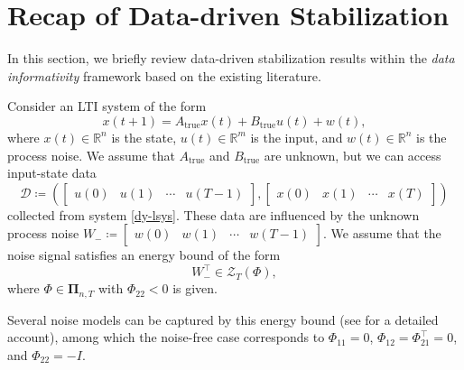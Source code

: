 \documentclass[9pt,shortpaper,twoside,web]{ieeecolor}
\newcommand{\beq}{\begin{equation}}
\newcommand{\eeq}{\end{equation}}
\newcommand{\R}{\mathbb{R}}
\begin{document}
\section{Recap of Data-driven Stabilization}
\label{sec:II}
In this section, we briefly review data-driven stabilization results within the \emph{data informativity} framework \cite{van2020data,HenkSlemma,van2023informativity,DBLSCT2025} based on the existing literature. %

Consider an LTI system of the form
\beq
  x(t+1)=A_\text{true}x(t)+B_\text{true}u(t)+w(t),
  \label{dy-lsys}
\eeq
where $x(t)\in\R^n$ is the state, $u(t) \in \R^m$ is the input, and $w(t)\in\R^n$ is the process noise. We assume that $A_\text{true}$ and $B_\text{true}$ are unknown, but we can access input-state data
\begin{equation}
\label{eq:data}
\mathcal{D}\!\coloneqq\!\left(\begin{bmatrix}
    u(0) \!\!&\!\! u(1)  \!\!&\!\! \cdots \!\!&\!\! u(T-1)
\end{bmatrix}, \begin{bmatrix}
    x(0) \!\!&\!\! x(1) \!\!&\!\! \cdots \!\!&\!\! x(T)
\end{bmatrix}\right)
\end{equation} 
collected from system \eqref{dy-lsys}. These data are influenced by the unknown process noise $W_-\coloneqq\begin{bmatrix}
w(0) & w(1) & \cdots & w(T-1)
\end{bmatrix}$. We assume that the noise signal satisfies an energy bound of the form
\begin{equation}
\label{eq:ass1-1}
W_-^\top\in\mathcal{Z}_T(\Phi),
\end{equation} 
where $\Phi\in\pmb{\Pi}_{n,T}$ with $\Phi_{22}<0$ is given.

Several noise models can be captured by this energy bound (see \cite[p. 4]{HenkQMI2023} for a detailed account), among which the noise-free case corresponds to $\Phi_{11}=0$, $\Phi_{12}=\Phi_{21}^\top=0$, and $\Phi_{22}=-I$. 
\end{document}
